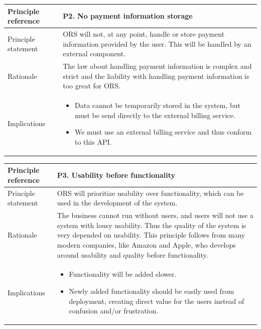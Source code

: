 \documentclass[a4paper,11pt]{report}
\begin{document}
\begin{center}
  \begin{tabular}[h!]{| >{\columncolor{gray}}p{} | p{} |}
    \hline
    Principle reference & P2. No payment information storage\\
    \hline
    Principle statement & ORS will not, at any point, handle or store payment information provided by the user. This will be handled by an external component.\\
    \hline
    Rationale & The law about handling payment information is complex and strict and the liability with handling payment information is too great for ORS.\\
    \hline
    Implications &
      \begin{itemize}
        \item Data cannot be temporarily stored in the system, but must be send directly to the external billing service.
        \item We must use an external billing service and thus conform to this API.
      \end{itemize}\\
    \hline
  \end{tabular}
\end{center}

\begin{center}
  \begin{tabular}[h!]{| >{\columncolor{gray}}p{} | p{} |}
    \hline
    Principle reference & P3. Usability before functionality\\
    \hline
    Principle statement & ORS will prioritize usability over functionality, which can be used in the development of the system.\\
    \hline
    Rationale & The business cannot run without users, and users will not use a system with lousy usability. Thus the quality of the system is very depended on usability. This principle follows from many modern companies, like Amazon and Apple, who develops around usability and quality before functionality. \\
    \hline
    Implications &
      \begin{itemize}
        \item Functionality will be added slower.
        \item Newly added functionality should be easily used from deployment, creating direct value for the users instead of confusion and/or frustration.
      \end{itemize}\\
    \hline
  \end{tabular}
\end{center}
\end{document}
